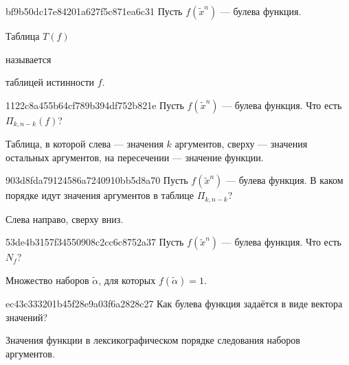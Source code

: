 \begin{note}{bf9b50dc17e84201a627f5c871ea6c31}
    Пусть \({ f(\widetilde x^{n}) }\) --- булева функция.
    \begin{icloze}{2}Таблица \({ T(f) }\)\end{icloze} называется \begin{icloze}{1}таблицей истинности \({ f }\).\end{icloze}
\end{note}

\begin{note}{1122c8a455b64cf789b394df752b821e}
    Пусть \({ f(\widetilde x^{n}) }\) --- булева функция.
    Что есть \({ \Pi_{k,n-k}(f) }\)?

    \begin{cloze}{1}
        Таблица, в которой слева --- значения \({ k }\) аргументов, сверху --- значения остальных аргументов, на пересечении --- значение функции.
    \end{cloze}
\end{note}

\begin{note}{903d8fda79124586a7240910bb5d8a70}
    Пусть \({ f(\widetilde x^{n}) }\) --- булева функция.
    В каком порядке идут значения аргументов в таблице \({ \Pi_{k,n-k} }\)?

    \begin{cloze}{1}
        Слева направо, сверху вниз.
    \end{cloze}
\end{note}

\begin{note}{53de4b3157f34550908c2cc6c8752a37}
    Пусть \({ f(\widetilde x^{n}) }\) --- булева функция.
    Что есть \({ N_{f} }\)?

    \begin{cloze}{1}
        Множество наборов \({ \widetilde \alpha }\), для которых \({ f(\widetilde \alpha) = 1 }\).
    \end{cloze}
\end{note}

\begin{note}{ec43c333201b45f28e9a03f6a2828c27}
    Как булева функция задаётся в виде вектора значений?

    \begin{cloze}{1}
        Значения функции в лексикографическом порядке следования наборов аргументов.
    \end{cloze}
\end{note}

